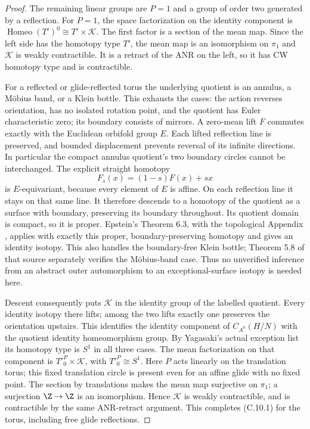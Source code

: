 \begin{proof}
The remaining linear groups are $P=1$ and a group of order two generated
by a reflection. For $P=1$, the space factorization on the identity
component is $\operatorname{Homeo}(T')^0\cong T'\times\mathcal K$.
The first factor is a section of the mean map. Since the left side has
the homotopy type $T'$, the mean map is an isomorphism on $\pi_1$ and
$\mathcal K$ is weakly contractible. It is a retract of the ANR on the
left, so it has CW homotopy type and is contractible.

For a reflected or glide-reflected torus the underlying quotient is an
annulus, a M\"obius band, or a Klein bottle. This exhausts the cases:
the action reverses orientation, has no isolated rotation point, and
the quotient has Euler characteristic zero; its boundary consists of
mirrors. A zero-mean lift $F$ commutes exactly with the Euclidean orbifold
group $E$. Each lifted reflection line is preserved, and bounded
displacement prevents reversal of its infinite directions. In
particular the compact annulus quotient's two boundary circles cannot
be interchanged. The explicit straight homotopy
\[
                  F_s(x)=(1-s)F(x)+sx
\]
is $E$-equivariant, because every element of $E$ is affine. On each
reflection line it stays on that same line. It therefore descends to
a homotopy of the quotient as a surface with boundary, preserving its
boundary throughout. Its quotient domain is compact, so it is proper.
Epstein's Theorem 6.3, with the topological Appendix
\cite{C_Epstein1966}, applies with exactly this proper,
boundary-preserving homotopy and gives an identity isotopy. This also
handles the boundary-free Klein bottle; Theorem 5.8 of that source
separately verifies the M\"obius-band case. Thus no unverified inference
from an abstract outer automorphism to an exceptional-surface isotopy
is needed here.

Descent consequently puts $\mathcal K$ in the identity group of the
labelled quotient. Every identity isotopy there lifts; among the two
lifts exactly one preserves the orientation upstairs. This identifies
the identity component of $C_{A^0}(H/N)$ with the quotient identity
homeomorphism group. By Yagasaki's actual exception list its homotopy
type is $S^1$ in all three cases. The mean factorization on that component
is $T'^P_0\times\mathcal K$, with $T'^P_0\cong S^1$. Here
$P$ acts linearly on the translation torus; this fixed translation
circle is present even for an affine glide with no fixed point.
The section by translations makes the mean map surjective on $\pi_1$;
a surjection $\Z\to\Z$ is an isomorphism. Hence $\mathcal K$ is
weakly contractible, and is contractible by the same ANR-retract argument.
This completes (C.10.1) for the torus, including free glide reflections.


\end{proof}
